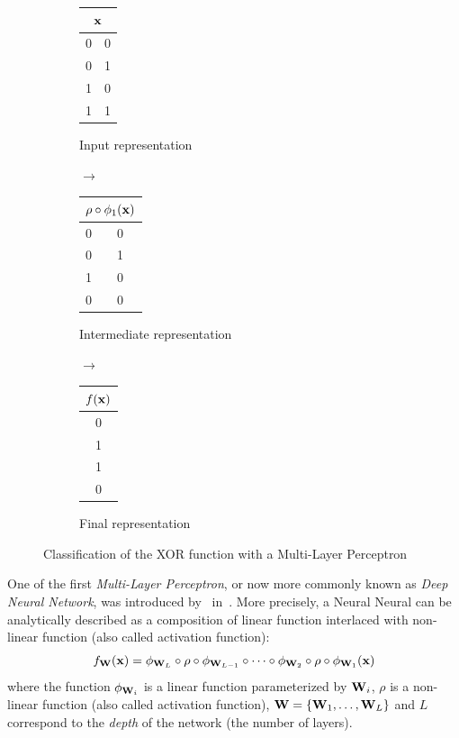 \begin{figure}[ht]
  \centering
  \begin{subfigure}[t]{0.30\textwidth}
    \centering
    \begin{tabular}{c|c}
      \multicolumn{2}{c}{$\mathbf{x}$} \\
      \midrule
      0 & 0 \\
      0 & 1 \\
      1 & 0 \\
      1 & 1
    \end{tabular} 
    \caption*{Input representation}
  \end{subfigure}
  \begin{subfigure}[t]{0.03\textwidth}
    $\rightarrow$
  \end{subfigure}
  \begin{subfigure}[t]{0.30\textwidth}
    \centering
    \begin{tabular}{C{0.5cm} | C{0.5cm}}
       \\
       & 0 \\
      0 & 1 \\
      1 & 0 \\
      0 & 0
    \end{tabular}
    \caption*{Intermediate representation}
  \end{subfigure}
  \begin{subfigure}[t]{0.03\textwidth}
    $\rightarrow$
  \end{subfigure}
  \begin{subfigure}[t]{0.30\textwidth}
    \centering
    \begin{tabular}{c}
      $f(\mathbf{x})$ \\
      \midrule
      0 \\
      1 \\
      1 \\
      0
    \end{tabular}
    \caption*{Final representation}
  \end{subfigure}
  \caption{Classification of the XOR function with a Multi-Layer Perceptron}
  \label{figure:multi_layer_perceptron}
\end{figure}


One of the first \emph{Multi-Layer Perceptron}, or now more commonly known as \emph{Deep Neural Network}, was introduced by~\citeauthor{ivakhnenko1967cybernetics} in~\citeyear{ivakhnenko1967cybernetics}.
More precisely, a Neural Neural can be analytically described as a composition of linear function interlaced with non-linear function (also called activation function):
\begin{equation}
  f_\mathbf{W}(\mathbf{x}) = \phi_{\mathbf{W}_L} \circ \rho \circ \phi_{\mathbf{W}_{L-1}} \circ \cdots \circ \phi_{\mathbf{W}_2} \circ \rho \circ \phi_{\mathbf{W}_1}(\mathbf{x})
  \label{equation:neural_network}
\end{equation}
where the function $\phi_{\mathbf{W}_i}$ is a linear function parameterized by $\mathbf{W}_i$, $\rho$ is a non-linear function (also called activation function), $\mathbf{W} = \{\mathbf{W}_1, \dots, \mathbf{W}_L \}$ and $L$ correspond to the \emph{depth} of the network (\ie the number of layers).

